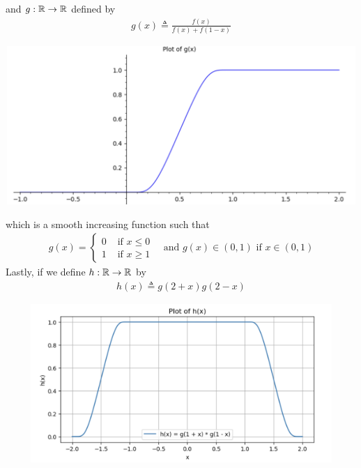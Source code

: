 \documentclass{report}
\begin{document}
\begin{mdframed}
\begin{center}
\end{center}
and  $g:\mathbb{R}\rightarrow \mathbb{R}$ defined by 
\begin{align}
\label{gsm}
g(x)\triangleq \frac{f(x)}{f(x)+f(1-x)}
\end{align}
\begin{center}
   \begin{minipage}{0.9\linewidth}  
       \centering
       \includegraphics[height=6cm,width=16cm]{g_graph}
   \end{minipage}
\end{center}
which is a smooth increasing function such that  
\begin{align*}
g(x)=\begin{cases}
  0& \text{ if $x\leq 0$ }\\
  1& \text{ if $x\geq 1$ }
\end{cases}\text{ and }g(x)\in (0,1)\text{ if }x\in (0,1)
\end{align*}
Lastly, if we define $h:\mathbb{R}\rightarrow \mathbb{R}$ by
\begin{align*}
h(x)\triangleq g(2+x)g(2-x)
\end{align*}
\begin{center}
   \begin{minipage}{0.9\linewidth}  
       \centering
       \includegraphics[height=6cm,width=16cm]{h_graph_rev}
   \end{minipage}

\end{center}
\end{mdframed}
\end{document}
